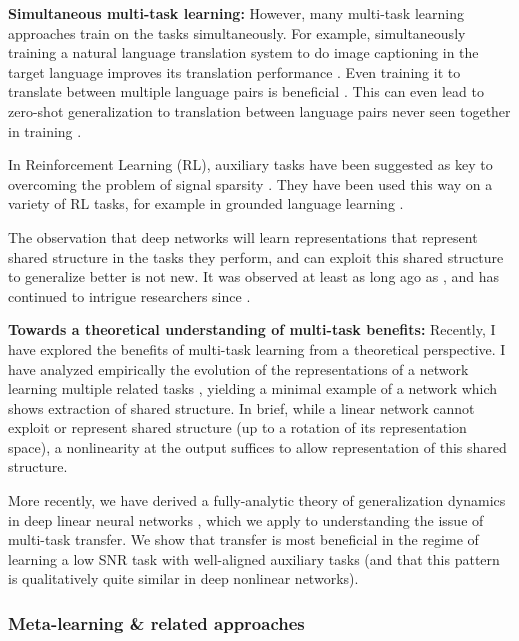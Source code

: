 \documentclass[11pt]{article}
\begin{document}
\textbf{Simultaneous multi-task learning:} However, many multi-task learning approaches train on the tasks simultaneously. For example, simultaneously training a natural language translation system to do image captioning in the target language improves its translation performance \citep{Luong2016}. Even training it to translate between multiple language pairs is beneficial \citep{Dong2015}. This can even lead to zero-shot generalization to translation between language pairs never seen together in training \citep{Johnson2016a}. \par 
In Reinforcement Learning (RL), auxiliary tasks have been suggested as key to overcoming the problem of signal sparsity \citep[e.g.]{LeCun2016}. They have been used this way on a variety of RL tasks, for example in grounded language learning \citep{Hermann2017}. \par
The observation that deep networks will learn representations that represent shared structure in the tasks they perform, and can exploit this shared structure to generalize better is not new. It was observed at least as long ago as \citet{Hinton1986}, and has continued to intrigue researchers since \citep[e.g]{Rogers2008}.  

\textbf{Towards a theoretical understanding of multi-task benefits:} Recently, I have explored the benefits of multi-task learning from a theoretical perspective. I have analyzed empirically the evolution of the representations of a network learning multiple related tasks \citep{Lampinen2017a}, yielding a minimal example of a network which shows extraction of shared structure. In brief, while a linear network cannot exploit or represent shared structure (up to a rotation of its representation space), a nonlinearity at the output suffices to allow representation of this shared structure. \par
More recently, we have derived a fully-analytic theory of generalization dynamics in deep linear neural networks \citep{Lampinen2019}, which we apply to understanding the issue of multi-task transfer. We show that transfer is most beneficial in the regime of learning a low SNR task with well-aligned auxiliary tasks (and that this pattern is qualitatively quite similar in deep nonlinear networks). 

\subsubsection{Meta-learning \& related approaches}
\end{document}

